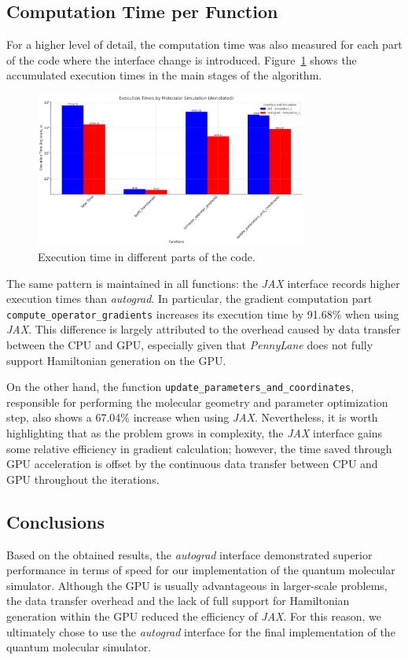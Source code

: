 \subsection{Computation Time per Function}
For a higher level of detail, the computation time was also measured for each part of the code where the interface change is introduced. Figure~\ref{fig:time_functions} shows the accumulated execution times in the main stages of the algorithm.

\begin{figure}[H]
  \centering
  \includegraphics[width=0.8\textwidth]{img/time_functions.png}
  \caption{Execution time in different parts of the code.}
  \label{fig:time_functions}
\end{figure}

The same pattern is maintained in all functions: the \textit{JAX} interface records higher execution times than \textit{autograd}. In particular, the gradient computation part \texttt{compute\_operator\_gradients} increases its execution time by 91.68\% when using \textit{JAX}. This difference is largely attributed to the overhead caused by data transfer between the CPU and GPU, especially given that \textit{PennyLane} does not fully support Hamiltonian generation on the GPU.

On the other hand, the function \texttt{update\_parameters\_and\_coordinates}, responsible for performing the molecular geometry and parameter optimization step, also shows a 67.04\% increase when using \textit{JAX}. Nevertheless, it is worth highlighting that as the problem grows in complexity, the \textit{JAX} interface gains some relative efficiency in gradient calculation; however, the time saved through GPU acceleration is offset by the continuous data transfer between CPU and GPU throughout the iterations.

\subsection{Conclusions}
Based on the obtained results, the \textit{autograd} interface demonstrated superior performance in terms of speed for our implementation of the quantum molecular simulator. Although the GPU is usually advantageous in larger-scale problems, the data transfer overhead and the lack of full support for Hamiltonian generation within the GPU reduced the efficiency of \textit{JAX}. For this reason, we ultimately chose to use the \textit{autograd} interface for the final implementation of the quantum molecular simulator.

